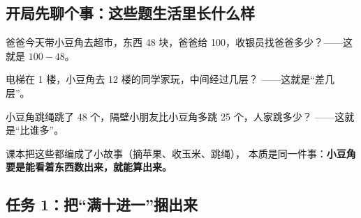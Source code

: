 \subsection{开局先聊个事：这些题生活里长什么样}

爸爸今天带小豆角去超市，东西 48 块，爸爸给 100，收银员找爸爸多少？——这就是 $100-48$。

电梯在 1 楼，小豆角去 12 楼的同学家玩，中间经过几层？
——这就是“差几层”。

小豆角跳绳跳了 48 个，隔壁小朋友比小豆角多跳 25 个，人家跳多少？
——这就是“比谁多”。

课本把这些都编成了小故事（摘苹果、收玉米、跳绳），
本质是同一件事：\textbf{小豆角要是能看着东西数出来，就能算出来。}

\subsection{任务 1：把“满十进一”捆出来}

